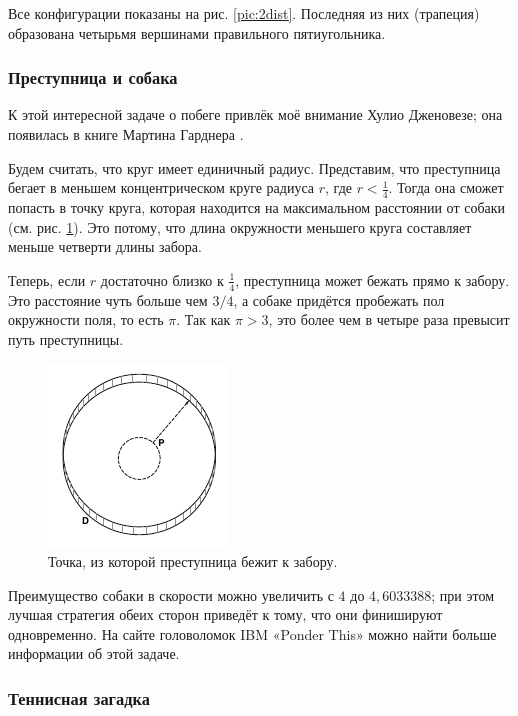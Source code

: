 Все конфигурации показаны на рис. \ref{pic:2dist}.
Последняя из них (трапеция) образована четырьмя вершинами правильного пятиугольника.


\subsubsection*{Преступница и собака}

К этой интересной задаче о побеге привлёк моё внимание Хулио Дженовезе;
она появилась в книге Мартина Гарднера \cite{24}.

Будем считать, что круг имеет единичный радиус.
Представим, что преступница бегает в меньшем концентрическом круге радиуса $r$, где $r < \tfrac14$.
Тогда она сможет попасть в точку круга, которая находится на максимальном расстоянии от собаки (см. рис. \ref{pic:dog}).
Это потому, что длина окружности меньшего круга составляет меньше четверти длины забора.

Теперь, если $r$ достаточно близко к $\tfrac14$, преступница может бежать прямо к забору.
Это расстояние чуть больше чем $3/4$, а собаке придётся пробежать пол окружности поля, то есть $\pi$.
Так как $\pi > 3$, это более чем в четыре раза превысит путь преступницы.

\begin{figure}[h!]
\centering
\includegraphics[scale=1]{pics/dog}
\caption{Точка, из которой преступница бежит к забору.}
\label{pic:dog}
\end{figure}

Преимущество собаки в скорости можно увеличить с $4$ до $4{,}6033388$; при этом лучшая стратегия обеих сторон приведёт к тому, что они финишируют одновременно.
На сайте головоломок IBM «Ponder This» \cite[май 2001]{ponder-this} можно найти больше информации об этой задаче.

\subsubsection*{Теннисная загадка}

